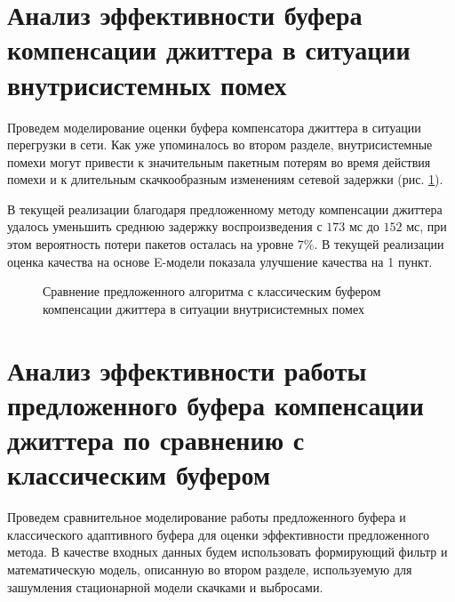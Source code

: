 \section{Анализ эффективности буфера компенсации джиттера в ситуации внутрисистемных помех} \label{sect4}

Проведем моделирование оценки буфера компенсатора джиттера в ситуации перегрузки в сети. 
Как уже упоминалось во втором разделе, внутрисистемные помехи могут привести к значительным пакетным потерям во время действия помехи и к длительным скачкообразным изменениям сетевой задержки (рис. \ref{img4:distBuff}).


В текущей реализации благодаря предложенному методу компенсации джиттера удалось уменьшить среднюю задержку воспроизведения с $173$ мс до $152$ мс, при этом вероятность потери пакетов осталась на уровне $7\%$.
В текущей реализации оценка качества на основе E-модели показала улучшение качества на 1 пункт.



\pgfplotsset{width=15cm, height=10cm, compat=1.3}
\begin{figure} [!ht]
  \center
{}
\caption{Сравнение предложенного алгоритма с классическим буфером компенсации джиттера в ситуации внутрисистемных помех}
  \label{img4:distBuff}
\end{figure}


\section{Анализ эффективности работы предложенного буфера компенсации джиттера по сравнению с классическим буфером}

Проведем сравнительное моделирование работы предложенного буфера и классического адаптивного буфера для оценки эффективности предложенного метода.
В качестве входных данных будем использовать формирующий фильтр и математическую модель, описанную во втором разделе, используемую для зашумления стационарной модели скачками и выбросами.

